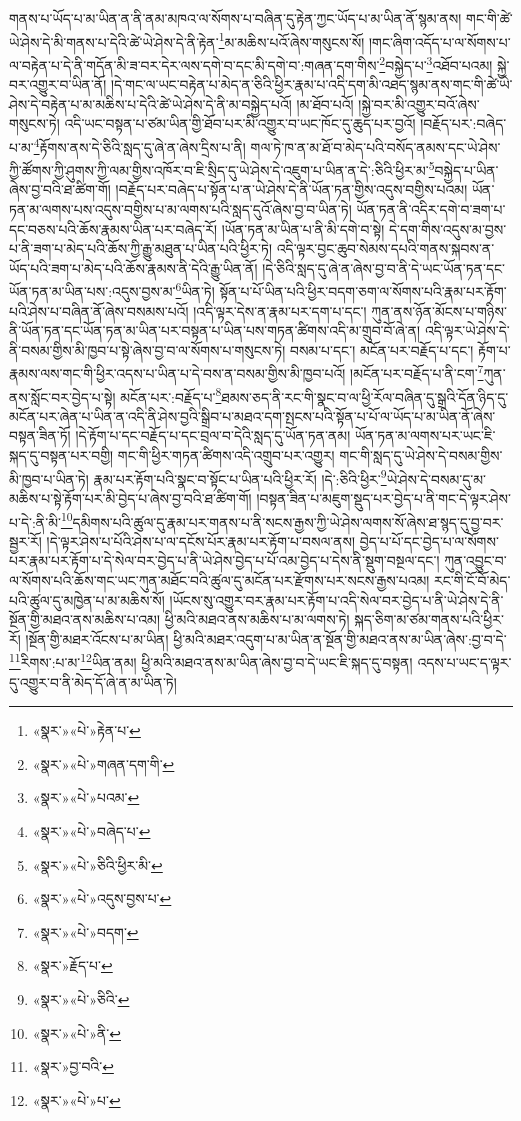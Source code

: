 གནས་པ་ཡོད་པ་མ་ཡིན་ན་ནི་ནམ་མཁའ་ལ་སོགས་པ་བཞིན་དུ་རྟེན་ཀྱང་ཡོད་པ་མ་ཡིན་ནོ་སྙམ་ནས། གང་གི་ཚེ་ཡེ་ཤེས་དེ་མི་གནས་པ་དེའི་ཚེ་ཡེ་ཤེས་དེ་ནི་རྟེན་\footnote{«སྣར་»«པེ་»རྟེན་པ་}མ་མཆིས་པའོ་ཞེས་གསུངས་སོ། །གང་ཞིག་འདོད་པ་ལ་སོགས་པ་ལ་བརྟེན་པ་དེ་ནི་གདོན་མི་ཟ་བར་དེར་ལས་དགེ་བ་དང་མི་དགེ་བ་:གཞན་དག་གིས་\footnote{«སྣར་»«པེ་»གཞན་དག་གི་}བསྐྱེད་པ་\footnote{«སྣར་»«པེ་»པའམ་}འཐོབ་པའམ། སྐྱེ་བར་འགྱུར་བ་ཡིན་ནོ། །དེ་གང་ལ་ཡང་བརྟེན་པ་མེད་ན་ཅིའི་ཕྱིར་རྣམ་པ་འདི་དག་མི་འཐད་སྙམ་ནས་གང་གི་ཚེ་ཡེ་ཤེས་དེ་བརྟེན་པ་མ་མཆིས་པ་དེའི་ཚེ་ཡེ་ཤེས་དེ་ནི་མ་བསྐྱེད་པའོ། །མ་ཐོབ་པའོ། །སྐྱེ་བར་མི་འགྱུར་བའོ་ཞེས་གསུངས་ཏེ། འདི་ཡང་བསྟན་པ་ཙམ་ཡིན་གྱི་ཐོབ་པར་མི་འགྱུར་བ་ཡང་ཁོང་དུ་ཆུད་པར་བྱའོ། །བརྗོད་པར་:བཞེད་པ་མ་\footnote{«སྣར་»«པེ་»བཞེད་པ་}རྟོགས་ནས་དེ་ཅིའི་སླད་དུ་ཞེ་ན་ཞེས་དྲིས་པ་ནི། གལ་ཏེ་ཁ་ན་མ་ཐོ་བ་མེད་པའི་བསོད་ནམས་དང་ཡེ་ཤེས་ཀྱི་ཚོགས་ཀྱི་ཤུགས་ཀྱི་ལམ་གྱིས་འཁོར་བ་ཇི་སྲིད་དུ་ཡེ་ཤེས་དེ་འཇུག་པ་ཡིན་ན་དེ་:ཅིའི་ཕྱིར་མ་\footnote{«སྣར་»«པེ་»ཅིའི་ཕྱིར་མི་}བསྐྱེད་པ་ཡིན་ཞེས་བྱ་བའི་ཐ་ཚིག་གོ། །བརྗོད་པར་བཞེད་པ་སྟོན་པ་ན་ཡེ་ཤེས་དེ་ནི་ཡོན་ཏན་གྱིས་འདུས་བགྱིས་པའམ། ཡོན་ཏན་མ་ལགས་པས་འདུས་བགྱིས་པ་མ་ལགས་པའི་སླད་དུའོ་ཞེས་བྱ་བ་ཡིན་ཏེ། ཡོན་ཏན་ནི་འདིར་དགེ་བ་ཟག་པ་དང་བཅས་པའི་ཆོས་རྣམས་ཡིན་པར་བཞེད་རོ། །ཡོན་ཏན་མ་ཡིན་པ་ནི་མི་དགེ་བ་སྟེ། དེ་དག་གིས་འདུས་མ་བྱས་པ་ནི་ཟག་པ་མེད་པའི་ཆོས་ཀྱི་རྒྱུ་མཐུན་པ་ཡིན་པའི་ཕྱིར་ཏེ། འདི་ལྟར་བྱང་ཆུབ་སེམས་དཔའི་གནས་སྐབས་ན་ཡོད་པའི་ཟག་པ་མེད་པའི་ཆོས་རྣམས་ནི་དེའི་རྒྱུ་ཡིན་ནོ། །དེ་ཅིའི་སླད་དུ་ཞེ་ན་ཞེས་བྱ་བ་ནི་དེ་ཡང་ཡོན་ཏན་དང་ཡོན་ཏན་མ་ཡིན་པས་:འདུས་བྱས་མ་\footnote{«སྣར་»«པེ་»འདུས་བྱས་པ་}ཡིན་ཏེ། སྟོན་པ་པོ་ཡིན་པའི་ཕྱིར་བདག་ཅག་ལ་སོགས་པའི་རྣམ་པར་རྟོག་པའི་ཤེས་པ་བཞིན་ནོ་ཞེས་བསམས་པའོ། །འདི་ལྟར་དེས་ན་རྣམ་པར་དག་པ་དང་། ཀུན་ནས་ཉོན་མོངས་པ་གཉིས་ནི་ཡོན་ཏན་དང་ཡོན་ཏན་མ་ཡིན་པར་བསྟན་པ་ཡིན་པས་གཏན་ཚིགས་འདི་མ་གྲུབ་བོ་ཞེ་ན། འདི་ལྟར་ཡེ་ཤེས་དེ་ནི་བསམ་གྱིས་མི་ཁྱབ་པ་སྟེ་ཞེས་བྱ་བ་ལ་སོགས་པ་གསུངས་ཏེ། བསམ་པ་དང་། མངོན་པར་བརྗོད་པ་དང་། རྟོག་པ་རྣམས་ལས་གང་གི་ཕྱིར་འདས་པ་ཡིན་པ་དེ་བས་ན་བསམ་གྱིས་མི་ཁྱབ་པའོ། །མངོན་པར་བརྗོད་པ་ནི་ངག་\footnote{«སྣར་»«པེ་»བདག་}ཀུན་ནས་སློང་བར་བྱེད་པ་སྟེ། མངོན་པར་:བརྗོད་པ་\footnote{«སྣར་»རྗོད་པ་}ཐམས་ཅད་ནི་རང་གི་སྣང་བ་ལ་ཕྱི་རོལ་བཞིན་དུ་སྒྲའི་དོན་ཉིད་དུ་མངོན་པར་ཞེན་པ་ཡིན་ན་འདི་ནི་ཤེས་བྱའི་སྒྲིབ་པ་མཐའ་དག་སྤངས་པའི་སྟོན་པ་པོ་ལ་ཡོད་པ་མ་ཡིན་ནོ་ཞེས་བསྟན་ཟིན་ཏོ། །དེ་རྟོག་པ་དང་བརྗོད་པ་དང་བྲལ་བ་དེའི་སླད་དུ་ཡོན་ཏན་ནམ། ཡོན་ཏན་མ་ལགས་པར་ཡང་ཇི་སྐད་དུ་བསྟན་པར་བགྱི། གང་གི་ཕྱིར་གཏན་ཚིགས་འདི་འགྲུབ་པར་འགྱུར། གང་གི་སླད་དུ་ཡེ་ཤེས་དེ་བསམ་གྱིས་མི་ཁྱབ་པ་ཡིན་ཏེ། རྣམ་པར་རྟོག་པའི་སྣང་བ་སྟོང་པ་ཡིན་པའི་ཕྱིར་རོ། །དེ་:ཅིའི་ཕྱིར་\footnote{«སྣར་»«པེ་»ཅིའི་}ཡེ་ཤེས་དེ་བསམ་དུ་མ་མཆིས་པ་སྟེ་རྟོག་པར་མི་བྱེད་པ་ཞེས་བྱ་བའི་ཐ་ཚིག་གོ། །བསྟན་ཟིན་པ་མཇུག་སྡུད་པར་བྱེད་པ་ནི་གང་དེ་ལྟར་ཤེས་པ་དེ་:ནི་མི་\footnote{«སྣར་»«པེ་»ནི་}དམིགས་པའི་ཚུལ་དུ་རྣམ་པར་གནས་པ་ནི་སངས་རྒྱས་ཀྱི་ཡེ་ཤེས་ལགས་སོ་ཞེས་ཐ་སྙད་དུ་བྱ་བར་སྦྱར་རོ། །དེ་ལྟར་ཤེས་པ་པོའི་ཤེས་པ་ལ་དངོས་པོར་རྣམ་པར་རྟོག་པ་བསལ་ནས། བྱེད་པ་པོ་དང་བྱེད་པ་ལ་སོགས་པར་རྣམ་པར་རྟོག་པ་དེ་སེལ་བར་བྱེད་པ་ནི་ཡེ་ཤེས་བྱེད་པ་པོ་འམ་བྱེད་པ་དེས་ནི་སྡུག་བསྔལ་དང་། ཀུན་འབྱུང་བ་ལ་སོགས་པའི་ཆོས་གང་ཡང་ཀུན་མཐོང་བའི་ཚུལ་དུ་མངོན་པར་རྫོགས་པར་སངས་རྒྱས་པའམ། རང་གི་ངོ་བོ་མེད་པའི་ཚུལ་དུ་མཁྱེན་པ་མ་མཆིས་སོ། །ཡོངས་སུ་འགྱུར་བར་རྣམ་པར་རྟོག་པ་འདི་སེལ་བར་བྱེད་པ་ནི་ཡེ་ཤེས་དེ་ནི་སྔོན་གྱི་མཐའ་ནས་མཆིས་པ་འམ། ཕྱི་མའི་མཐའ་ནས་མཆིས་པ་མ་ལགས་ཏེ། སྐད་ཅིག་མ་ཙམ་གནས་པའི་ཕྱིར་རོ། །སྔོན་གྱི་མཐར་འོངས་པ་མ་ཡིན། ཕྱི་མའི་མཐར་འདུག་པ་མ་ཡིན་ན་སྔོན་གྱི་མཐའ་ནས་མ་ཡིན་ཞེས་:བྱ་བ་དེ་\footnote{«སྣར་»བྱ་བའི་}རིགས་:པ་མ་\footnote{«སྣར་»«པེ་»པ་}ཡིན་ནམ། ཕྱི་མའི་མཐའ་ནས་མ་ཡིན་ཞེས་བྱ་བ་དེ་ཡང་ཇི་སྐད་དུ་བསྟན། འདས་པ་ཡང་ད་ལྟར་དུ་འགྱུར་བ་ནི་མེད་དོ་ཞེ་ན་མ་ཡིན་ཏེ། 